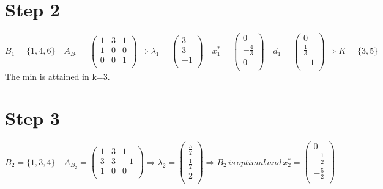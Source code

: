 \documentclass[a4paper,11pt,french]{article}
\begin{document}
   \section{Step 2}
  \begin{displaymath}
  B_1=\{1,4,6\}\quad A_{B_1}=\left(
\begin{array}{ccc}
1 & 3 & 1\\
1 & 0 & 0 \\
0 & 0 & 1\\
\end{array}
\right) \Rightarrow \lambda_1=\left(\begin{array}{c} 3\\ 3\\ -1\\ \end{array}\right)\quad x^*_1=\left(\begin{array}{c} 0\\ -\frac{4}{3}\\ 0\\ \end{array}\right)\quad d_1=\left(\begin{array}{c} 0\\ \frac{1}{3}\\ -1\\ \end{array}\right)\Rightarrow K=\{3,5\}
   \end{displaymath}
   The min is attained in k=3.
   
     \section{Step 3}
  \begin{displaymath}
  B_2=\{1,3,4\}\quad A_{B_2}=\left(
\begin{array}{ccc}
1 & 3 & 1\\
3 & 3 & -1 \\
1 & 0 & 0\\
\end{array}
\right) \Rightarrow \lambda_2=\left(\begin{array}{c} \frac{5}{2}\\ \frac{1}{2}\\ 2\\ \end{array}\right)\Rightarrow B_2\,is\,optimal\,and\,x^*_2=\left(\begin{array}{c}0 \\ -\frac{1}{2}\\ -\frac{5}{2}\\ \end{array}\right)
   \end{displaymath}
    
    
\end{document}
